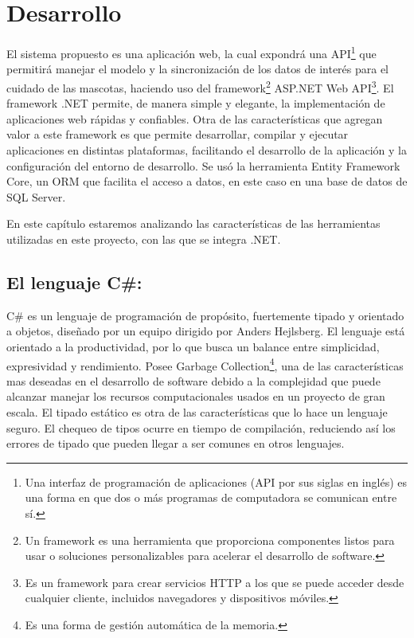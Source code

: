 \chapter{Desarrollo}\label{chapter:implementation}

El sistema propuesto es una aplicación web, la cual expondrá una API\footnote{Una interfaz de programación de aplicaciones (API por sus siglas en inglés) es una forma en que dos o más programas de computadora se comunican entre sí.} que permitirá manejar el modelo y la sincronización de los datos de interés para el cuidado de las mascotas, haciendo uso del framework\footnote{Un framework es una herramienta que proporciona componentes listos para usar o soluciones personalizables para acelerar el desarrollo de software.} ASP.NET Web API\footnote{Es un framework para crear servicios HTTP a los que se puede acceder desde cualquier cliente, incluidos navegadores y dispositivos móviles.}. El framework .NET permite, de manera simple y elegante, la implementación de aplicaciones web rápidas y confiables. Otra de las características que agregan valor a este framework es que permite desarrollar, compilar y ejecutar aplicaciones en distintas plataformas, facilitando el desarrollo de la aplicación y la configuración del entorno de desarrollo. Se usó la herramienta Entity Framework Core, un ORM que facilita el acceso a datos, en este caso en una base de datos de SQL Server.
\newline

En este capítulo estaremos analizando las características de las herramientas utilizadas en este proyecto, con las que se integra .NET.

\section{El lenguaje C\#:}

C\# es un lenguaje de programación de propósito, fuertemente tipado y orientado a objetos, diseñado por un equipo dirigido por Anders Hejlsberg. El lenguaje está orientado a la productividad, por lo que busca un balance entre simplicidad, expresividad y rendimiento. Posee Garbage Collection\footnote{Es una forma de gestión automática de la memoria.}, una de las características mas deseadas en el desarrollo de software debido a la complejidad que puede alcanzar manejar los recursos computacionales usados en un proyecto de gran escala. El tipado estático es otra de las características que lo hace un lenguaje seguro. El chequeo de tipos ocurre en tiempo de compilación, reduciendo así los errores de tipado que pueden llegar a ser comunes en otros lenguajes.
\newline

